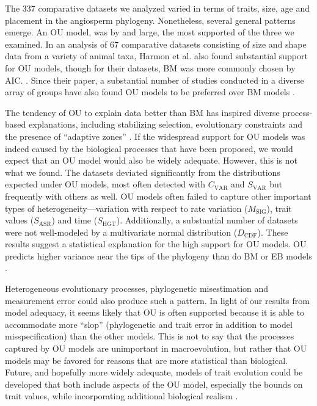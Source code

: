 The 337 comparative datasets we analyzed varied in terms of traits, size, age and placement in the angiosperm phylogeny. Nonetheless, several general patterns emerge. An OU model, was by and large, the most supported of the three we examined. In an analysis of 67 comparative datasets consisting of size and shape data from a variety of animal taxa, Harmon et al. \citep{Harmon2010} also found substantial support for OU models, though for their datasets, BM was more commonly chosen by AIC. \citep[We note, however, that many of their datasets were quite small; see][]{SlaterPennell}. Since their paper, a substantial number of studies conducted in a diverse array of groups have also found OU models to be preferred over BM models \citep[e.g.,][]{Burbrink2012, Wiens2013, Lopez2013, Thomaspreprint}. 

The tendency of OU to explain data better than BM has inspired diverse process-based explanations, including stabilizing selection, evolutionary constraints and the presence of ``adaptive zones'' \citep{HansenMartins1996, ButlerKing2004, Hansen2012book, PennellHarmon}. 
If the widespread support for OU models was indeed caused by the biological processes that have been proposed, we would expect that an OU model would also be widely adequate. However, this is not what we found. The datasets deviated significantly from the distributions expected under OU models, most often detected with $C_{\text{VAR}}$ and $S_{\text{VAR}}$ but frequently with others as well. OU models often failed to capture other important types of heterogeneity---variation with respect to rate variation ($M_{\text{SIG}}$), trait values ($S_{\text{ASR}}$) and time ($S_{\text{HGT}}$). Additionally, a substantial number of datasets were not well-modeled by a multivariate normal distribution ($D_{\text{CDF}}$). These results suggest a statistical explanation for the high support for OU models. OU predicts higher variance near the tips of the phylogeny than do BM or EB models \citep[see Figure 1 in][]{Harmon2010}. 

Heterogeneous evolutionary processes, phylogenetic misestimation and measurement error could also produce such a pattern. In light of our results from model adequacy, it seems likely that OU is often supported because it is able to accommodate more ``slop'' (phylogenetic and trait error in addition to model misspecification) than the other models.  This is not to say that the processes captured by OU models are unimportant in macroevolution, but rather that OU models may be favored for reasons that are more statistical than biological. Future, and hopefully more widely adequate, models of trait evolution could be developed that both include aspects of the OU model, especially the bounds on trait values, while incorporating additional biological realism \citep[for a recent example of such a model, see][]{NuismerHarmon}.

